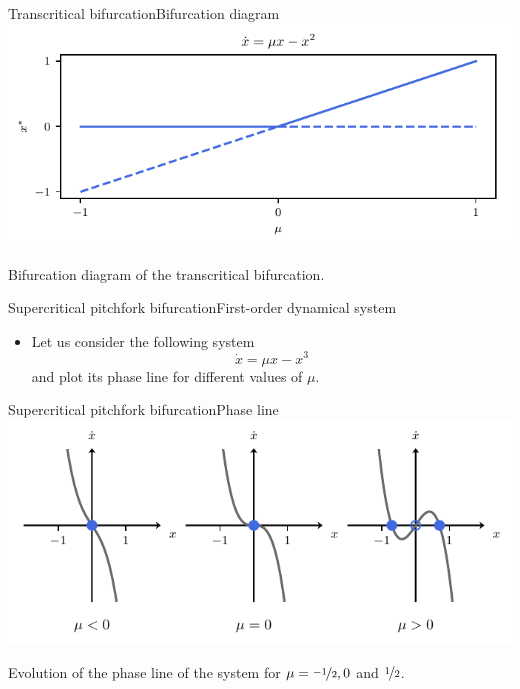 \documentclass[usenames,dvipsnames,svgnames,10pt,aspectratio=169]{beamer}
\begin{document}
\begin{frame}[t, c]{Transcritical bifurcation}{Bifurcation diagram}
	\centering
	\includegraphics[width=.75\textwidth]{transcritical_bifurcation_diagram}

	Bifurcation diagram of the transcritical bifurcation.
	\vspace{1cm}
\end{frame}

%

\begin{frame}[t, c]{Supercritical pitchfork bifurcation}{First-order dynamical system}
	\begin{itemize}
		\item Let us consider the following system
		$$\dot{x} = \mu x - x^3$$
		and plot its phase line for different values of $\mu$.
	\end{itemize}

	\vspace{1cm}
\end{frame}

\begin{frame}[t, c]{Supercritical pitchfork bifurcation}{Phase line}
	\centering
	\includegraphics[width=.75\textwidth]{supercritical_pitchfork_phase_line}

	Evolution of the phase line of the system for $\mu = \nicefrac{-1}{2}, 0$ and $\nicefrac{1}{2}$.

	\vspace{1cm}
\end{frame}
\end{document}
